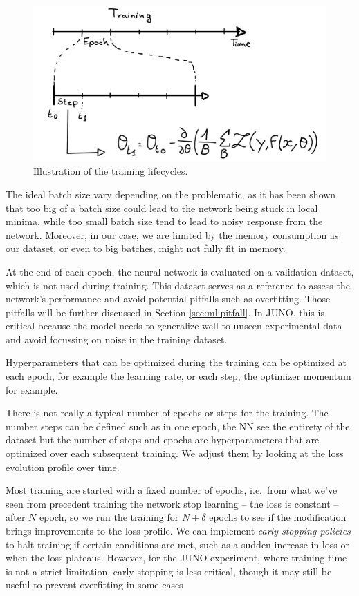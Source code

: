 \documentclass[../main.tex]{subfiles}
\begin{document}
\begin{figure}[ht]
  \centering
  \includegraphics[height=6cm]{images/ml/lifecycle.jpg}
  \caption{Illustration of the training lifecycles.}
  \label{fig:ml:lifecycle}
\end{figure}

The ideal batch size vary depending on the problematic, as it has been shown that too big of a batch size could lead to the network being stuck in local minima, while too small batch size tend to lead to noisy response from the network. Moreover, in our case, we are limited by the memory consumption as our dataset, or even to big batches, might not fully fit in memory.

At the end of each epoch, the neural network is evaluated on a validation dataset, which is not used during training. This dataset serves as a reference to assess the network's performance and avoid potential pitfalls such as overfitting. Those pitfalls will be further discussed in Section \ref{sec:ml:pitfall}. In JUNO, this is critical because the model needs to generalize well to unseen experimental data and avoid focussing on noise in the training dataset.

Hyperparameters that can be optimized during the training can be optimized at each epoch, for example the learning rate, or each step, the optimizer momentum for example.

There is not really a typical number of epochs or steps for the training. The number steps can be defined such as in one epoch, the NN see the entirety of the dataset but the number of steps and epochs are hyperparameters that are optimized over each subsequent training. We adjust them by looking at the loss evolution profile over time.

Most training are started with a fixed number of epochs, i.e.\ from what we've seen from precedent training the network stop learning -- the loss is constant -- after $N$ epoch, so we run the training for $N+\delta$ epochs to see if the modification brings improvements to the loss profile.
We can implement \textit{early stopping policies} to halt training if certain conditions are met, such as a sudden increase in loss or when the loss plateaus. However, for the JUNO experiment, where training time is not a strict limitation, early stopping is less critical, though it may still be useful to prevent overfitting in some cases
\end{document}
